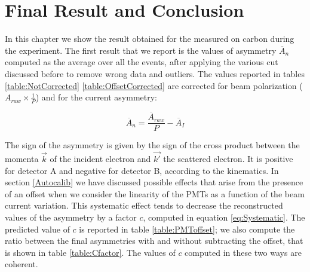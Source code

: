 \chapter{Final Result and Conclusion} \label{result}

In this chapter we show the result obtained for the \transv measured on carbon during the experiment.
The first result that we report is the values of asymmetry $\overline{A}_{n}$ computed as the average over all the events, after applying the various cut discussed before to remove wrong data and outliers. The values reported in tables \ref{table:NotCorrected} \ref{table:OffsetCorrected} are corrected for beam polarization ($A_{raw} \times \frac{1}{P}$) and for the current asymmetry:

\begin{equation}
\overline{A}_{n} = \frac{\overline{A}_{raw}}{P} - \overline{A}_{I}
\end{equation}

The sign of the asymmetry is given by the sign of the cross product between the momenta $\vec{k}$ of the incident electron and $\vec{k'}$ the scattered electron. It is positive for detector A and negative for detector B, according to the kinematics.
In section \ref{Autocalib} we have discussed possible effects that arise from the presence of an offset when we consider the linearity of the PMTs as a function of the beam current variation. This systematic effect tends to decrease the reconstructed values of the asymmetry by a factor $c$, computed in equation \ref{eq:Systematic}. The predicted value of $c$ is reported in table \ref{table:PMToffset}; we also compute the ratio between the final asymmetries with and without subtracting the offset, that is shown in table \ref{table:Cfactor}. The values of $c$ computed in these two ways are coherent.

